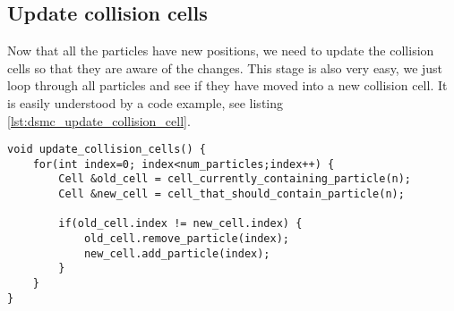 \subsection{Update collision cells}
Now that all the particles have new positions, we need to update the collision cells so that they are aware of the changes. This stage is also very easy, we just loop through all particles and see if they have moved into a new collision cell. It is easily understood by a code example, see listing \ref{lst:dsmc_update_collision_cell}.
\begin{lstlisting}[caption=Updating the collision cell particle lists., label=lst:dsmc_update_collision_cell]
void update_collision_cells() {
	for(int index=0; index<num_particles;index++) {
	    Cell &old_cell = cell_currently_containing_particle(n);
	    Cell &new_cell = cell_that_should_contain_particle(n);

	    if(old_cell.index != new_cell.index) {
	        old_cell.remove_particle(index);
	        new_cell.add_particle(index);
	    }
	}
}
\end{lstlisting}
